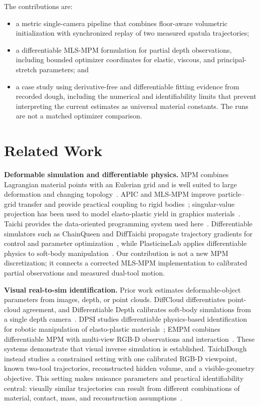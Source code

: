 The contributions are:
\begin{itemize}
    \item a metric single-camera pipeline that combines floor-aware volumetric initialization with synchronized replay of two measured spatula trajectories;
    \item a differentiable MLS-MPM formulation for partial depth observations, including bounded optimizer coordinates for elastic, viscous, and principal-stretch parameters; and
    \item a case study using derivative-free and differentiable fitting evidence from recorded dough, including the numerical and identifiability limits that prevent interpreting the current estimates as universal material constants. The runs are not a matched optimizer comparison.
\end{itemize}

\section{Related Work}
\label{sec:related}

\textbf{Deformable simulation and differentiable physics.}
MPM combines Lagrangian material points with an Eulerian grid and is well suited to large deformation and changing topology~\cite{jiang2016mpm}. APIC and MLS-MPM improve particle--grid transfer and provide practical coupling to rigid bodies~\cite{jiang2015apic,hu2018mlsmpm}; singular-value projection has been used to model elasto-plastic yield in graphics materials~\cite{stomakhin2013snow}. Taichi provides the data-oriented programming system used here~\cite{hu2019taichi}. Differentiable simulators such as ChainQueen and DiffTaichi propagate trajectory gradients for control and parameter optimization~\cite{hu2019chainqueen,hu2020difftaichi}, while PlasticineLab applies differentiable physics to soft-body manipulation~\cite{huang2021plasticinelab}. Our contribution is not a new MPM discretization; it connects a corrected MLS-MPM implementation to calibrated partial observations and measured dual-tool motion.

\textbf{Visual real-to-sim identification.}
Prior work estimates deformable-object parameters from images, depth, or point clouds. DiffCloud differentiates point-cloud agreement, and Differentiable Depth calibrates soft-body simulations from a single depth camera~\cite{sundaresan2022diffcloud,arnavaz2023diffdepth}. DPSI studies differentiable physics-based identification for robotic manipulation of elasto-plastic materials~\cite{yang2025dpsi}; EMPM combines differentiable MPM with multi-view RGB-D observations and interaction~\cite{chen2026empm}. These systems demonstrate that visual inverse simulation is established. TaichiDough instead studies a constrained setting with one calibrated RGB-D viewpoint, known two-tool trajectories, reconstructed hidden volume, and a visible-geometry objective. This setting makes nuisance parameters and practical identifiability central: visually similar trajectories can result from different combinations of material, contact, mass, and reconstruction assumptions~\cite{raue2011identifiability,brynjarsdottir2014discrepancy}.

